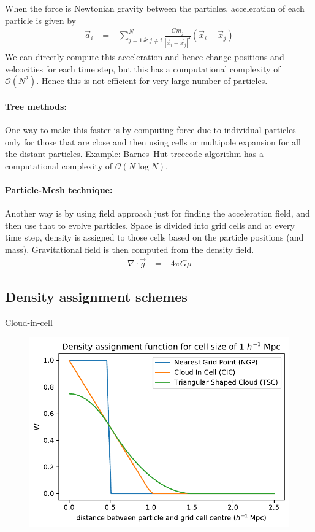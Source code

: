 \documentclass[12pt]{article}
\begin{document}
When the force is Newtonian gravity between the particles, acceleration of each particle is given by
\begin{align}
\vec{a}_i &= - \sum_{j=1 ~\&~ j\neq i}^{N} \frac{G m_j}{|\vec{x}_i-\vec{x}_j|^3} (\vec{x}_i-\vec{x}_j)
\end{align}
We can directly compute this acceleration and hence change positions and velcocities for each time step, but this has a computational complexity of $\mathcal{O}(N^2)$. Hence this is not efficient for very large number of particles.
\paragraph{Tree methods:}
One way to make this faster is by computing force due to individual particles only for those that are close and then using cells or multipole expansion for all the distant particles. Example: Barnes–Hut treecode algorithm has a computational complexity of $\mathcal{O}(N \log N)$.

\paragraph{Particle-Mesh technique:}
Another way is by using field approach just for finding the acceleration field, and then use that to evolve particles. Space is divided into grid cells and at every time step, density is assigned to those cells based on the particle positions (and mass). Gravitational field is then computed from the density field.
\begin{align}
\nabla \cdot \vec{g} &= - 4 \pi G \rho
\end{align}


\subsection*{Density assignment schemes}
Cloud-in-cell

\begin{figure}[H]
	\centering
	\includegraphics[width=0.7\linewidth]{../density_assign/density-assignment_functions}
	\caption{}
	\label{fig:density-assignmentfunctions}
\end{figure}
\end{document}

